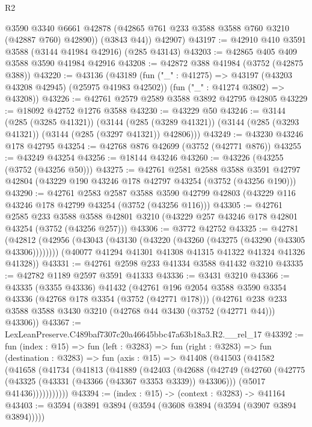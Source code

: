 \begin{lexlean}{R2}
\begin{coremodule}
          @3590
          @3340
          @6661
          @42878
          (@42865 @761 @233 @3588 @3588 @760 @3210 (@42887 @760) @42890))
        (@3843 @44))
      @42907)
@43197 := @42910 @410 @3591 @3588 (@3144 @41984 @42916) (@285 @43143)
@43203 := @42865 @405 @409 @3588 @3590 @41984 @42916
@43208 := @42872 @388 @41984 (@3752 (@42875 @388))
@43220 := @43136
    (@43189
      (fun ("_" : @41275) => @43197 (@43203 @43208 @42945) (@25975 @41983 @42502))
      (fun ("_" : @41274 @3802) => @43208))
@43226 := @42761 @2579 @2589 @3588 @3892 @42795 @42805
@43229 := @18092 @42752 @1276 @3588
@43230 := @43229 @50
@43246 := @3144
    (@285 (@3285 @41321))
    (@3144 (@285 (@3289 @41321)) (@3144 (@285 (@3293 @41321)) (@3144 (@285 (@3297 @41321)) @42806)))
@43249 := @43230 @43246 @178 @42795
@43254 := @42768 @876 @42699 (@3752 (@42771 @876))
@43255 := @43249 @43254
@43256 := @18144 @43246
@43260 := @43226 (@43255 (@3752 (@43256 @50)))
@43275 := @42761
    @2581
    @2588
    @3588
    @3591
    @42797
    @42804
    (@43229 @190 @43246 @178 @42797 @43254 (@3752 (@43256 @190)))
@43290 := @42761
    @2583
    @2587
    @3588
    @3590
    @42799
    @42803
    (@43229 @116 @43246 @178 @42799 @43254 (@3752 (@43256 @116)))
@43305 := @42761
    @2585
    @233
    @3588
    @3588
    @42801
    @3210
    (@43229 @257 @43246 @178 @42801 @43254 (@3752 (@43256 @257)))
@43306 := @3772 @42752
@43325 := @42781
    (@42812
      (@42956 (@43043 (@43130 (@43220 (@43260 (@43275 (@43290 (@43305 @43306))))))))
      (@40077 @41294 @41301 @41308 @41315 @41322 @41324 @41326 @41328))
@43331 := @42761 @2598 @233 @41334 @3588 @41432 @3210
@43335 := @42782 @1189 @2597 @3591 @41333
@43336 := @3431 @3210
@43366 := @43335
    (@3355 @43336)
    @41432
    (@42761
      @196
      @2054
      @3588
      @3590
      @3354
      @43336
      (@42768 @178 @3354 (@3752 (@42771 @178)))
      (@42761 @238 @233 @3588 @3588 @3430 @3210 (@42768 @44 @3430 (@3752 (@42771 @44))) @43306))
@43367 := LexLeanPreserve.C489baf7307c20a46645bbc47a63b18a3.R2.__rel_17
@43392 := fun (index : @15) =>
  fun (left : @3283) =>
  fun (right : @3283) =>
  fun (destination : @3283) =>
  fun (axis : @15) =>
  @41408
    (@41503
      (@41582
        (@41658
          (@41734
            (@41813
              (@41889
                (@42403
                  (@42688
                    (@42749
                      (@42760
                        (@42775 (@43325 (@43331 (@43366 (@43367 @3353 @3339)) @43306)))
                        (@5017 @41436)))))))))))
@43394 := (index : @15) -> (context : @3283) -> @41164
@43403 := @3594 (@3891 @3894 (@3594 (@3608 @3894 (@3594 (@3907 @3894 @3894)))))

\end{coremodule}
\end{lexlean}
